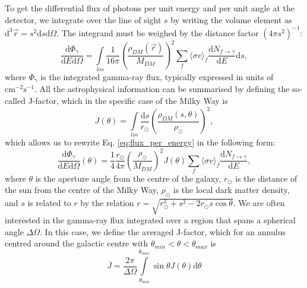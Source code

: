 To get the differential flux of photons per unit energy and per unit angle at the detector, we integrate over the line of sight \(s\) by writing the volume element as \(\mathrm{d} ^3 \vec{r}= s^2 \mathrm{d} s \mathrm{d} \Omega \). The integrand must be weighed by the distance factor \((4\pi s^2)^{-1} \):
\begin{equation}\label{eq:flux_per_energy}
	\frac{\mathrm{d}\Phi_{\gamma } }{\mathrm{d}E \mathrm{d} \Omega } = \int\limits_{los} \frac{1}{16\pi }\left( \frac{\rho_{DM} (\vec{r})}{M_{DM} } \right)^2 \sum_{f} \langle \sigma v \rangle _f \frac{\mathrm{d}N_{f\to \gamma } }{\mathrm{d}E} \mathrm{d} s,
\end{equation}
where \(\Phi_{\gamma } \) is the integrated gamma-ray flux, typically expressed in units of \(\mathrm{cm^{-2} s^{-1} } \). All the astrophysical information can be summarised by defining the so-called J-factor, which in the specific case of the Milky Way is
\begin{equation}
	J(\theta ) = \int\limits_{los} \frac{\mathrm{d}s}{r_\odot} \left( \frac{\rho_{DM} (s, \theta )}{\rho_\odot} \right)^2,
\end{equation}
which allows us to rewrite Eq. \eqref{eq:flux_per_energy} in the following form:
\begin{equation}
	\frac{\mathrm{d}\Phi_{\gamma } }{\mathrm{d}E \mathrm{d} \Omega }(\theta ) = \frac{1}{4} \frac{r_\odot}{4\pi }\left( \frac{\rho_\odot}{M_{DM} } \right)^2 J (\theta ) \sum_{f}  \langle \sigma v \rangle _f \frac{\mathrm{d}N_{f\to \gamma } }{\mathrm{d}E}, 
\end{equation}
where \(\theta \) is the aperture angle from the centre of the galaxy, \(r_\odot\) is the distance of the sun from the centre of the Milky Way, \(\rho_\odot\) is the local dark matter density, and \(s\) is related to \(r\) by the relation \(r=\sqrt{r_\odot^2 + s^2 - 2 r_\odot s \cos \theta } \). We are often interested in the gamma-ray flux integrated over a region that spans a spherical angle \(\Delta \Omega \). In this case, we define the averaged J-factor, which for an annulus centred around the galactic centre with \(\theta_{min }< \theta < \theta_{max} \) is \cite{Cirelli_2024}
\begin{equation}
	\overline{J} = \frac{2\pi }{\Delta \Omega } \int\limits_{\theta_{min}}^{\theta_{max} }\sin \theta J(\theta ) \mathrm{d} \theta 
\end{equation}

